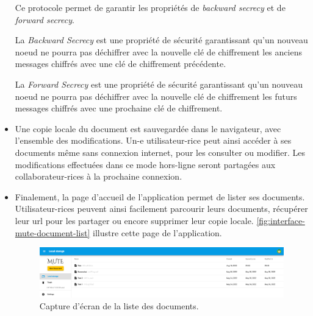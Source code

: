 \begin{itemize}
        Ce protocole permet de garantir les propriétés de \emph{backward secrecy} et de \emph{forward secrecy}.
        \begin{definition}
            La \emph{Backward Secrecy} est une propriété de sécurité garantissant qu'un nouveau noeud ne pourra pas déchiffrer avec la nouvelle clé de chiffrement les anciens messages chiffrés avec une clé de chiffrement précédente.
        \end{definition}
        \begin{definition}
            La \emph{Forward Secrecy} est une propriété de sécurité garantissant qu'un nouveau noeud ne pourra pas déchiffrer avec la nouvelle clé de chiffrement les futurs messages chiffrés avec une prochaine clé de chiffrement.
        \end{definition}
    \item Une copie locale du document est sauvegardée dans le navigateur, avec l'ensemble des modifications.
        Un-e utilisateur-rice peut ainsi accéder à ses documents même sans connexion internet, pour les consulter ou modifier.
        Les modifications effectuées dans ce mode hors-ligne seront partagées aux collaborateur-rices à la prochaine connexion.
    \item Finalement, la page d'accueil de l'application permet de lister ses documents.
        Utilisateur-rices peuvent ainsi facilement parcourir leurs documents, récupérer leur url pour les partager ou encore supprimer leur copie locale.
        \autoref{fig:interface-mute-document-list} illustre cette page de l'application.
        \begin{figure}[!ht]
            \centering
            \includegraphics[width=\linewidth]{img/screenshot-mute-document-list.png}
            \caption{Capture d'écran de la liste des documents.}
            \label{fig:interface-mute-document-list}
        \end{figure}
\end{itemize}
